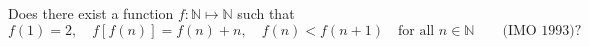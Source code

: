 Does there exist a function $f : \mathbb{N} \mapsto \mathbb{N}$ such that
\[ f(1) = 2,\quad f[f(n)] = f(n) + n,\quad f(n) < f(n + 1) \quad\text{for all } n \in \mathbb{N} \qquad \text{(IMO 1993)?} \]
